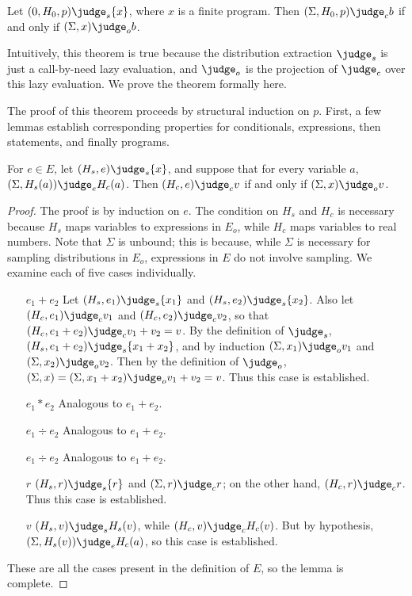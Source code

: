 \begin{theorem} \label{passert:thm:main}
Let $(0, H_0, p) \judge_s \{ x \}$, where $x$ is a finite program.
Then $(\Sigma, H_0, p) \judge_c b$ if and only if $(\Sigma, x) \judge_o b$.
\end{theorem}

Intuitively, this theorem is true because the distribution extraction
$\judge_s$ is just a call-by-need lazy evaluation, and $\judge_o$ is
the projection of $\judge_c$ over this lazy evaluation.  We prove the
theorem formally here.

The proof of this theorem proceeds by structural induction on $p$.
First, a few lemmas establish corresponding properties for
conditionals, expressions, then statements, and finally programs.

\begin{lemma} \label{passert:lem:expr}
  For $e \in E$, let $(H_s, e) \judge_s \{ x \}$, and suppose that for
  every variable $a$, $(\Sigma, H_s(a)) \judge_e H_c(a)$.  Then $(H_c,
  e) \judge_c v$ if and only if $(\Sigma, x) \judge_o v$.
\end{lemma}

\begin{proof}
The proof is by induction on $e$.  The condition on $H_s$ and $H_c$ is
necessary because $H_s$ maps variables to expressions in $E_o$, while
$H_c$ maps variables to real numbers.  Note that $\Sigma$ is unbound;
this is because, while $\Sigma$ is necessary for sampling
distributions in $E_o$, expressions in $E$ do not involve sampling.
We examine each of five cases individually.

\begin{itemize}
\item[$e_1 + e_2$] Let $(H_s, e_1) \judge_s \{ x_1 \}$ and $(H_s, e_2)
  \judge_s \{ x_2 \}$. Also let $(H_c, e_1) \judge_c v_1$ and $(H_c,
  e_2) \judge_c v_2$, so that $(H_c, e_1 + e_2) \judge_c v_1 + v_2 =
  v$.  By the definition of $\judge_s$, $(H_s, e_1 + e_2) \judge_s \{
  x_1 + x_2 \}$, and by induction $(\Sigma, x_1) \judge_o v_1$ and
  $(\Sigma, x_2) \judge_o v_2$.  Then by the definition of $\judge_o$,
  $(\Sigma, x) = (\Sigma, x_1 + x_2) \judge_o v_1 + v_2 = v$.  Thus
  this case is established.
\item[$e_1 * e_2$] Analogous to $e_1 + e_2$.
\item[$e_1 \div e_2$] Analogous to $e_1 + e_2$.
\item[$e_1 \div e_2$] Analogous to $e_1 + e_2$.
\item[$r$] $(H_s, r) \judge_s \{ r \}$ and $(\Sigma, r) \judge_c r$;
  on the other hand, $(H_c, r) \judge_c r$.  Thus this case is
  established.
\item[$v$] $(H_s, v) \judge_s H_s(v)$, while $(H_c, v) \judge_c
  H_c(v)$.  But by hypothesis, $(\Sigma, H_s(v)) \judge_e H_c(a)$, so
  this case is established.
\end{itemize}

These are all the cases present in the definition of $E$, so the lemma
is complete.

\end{proof}

